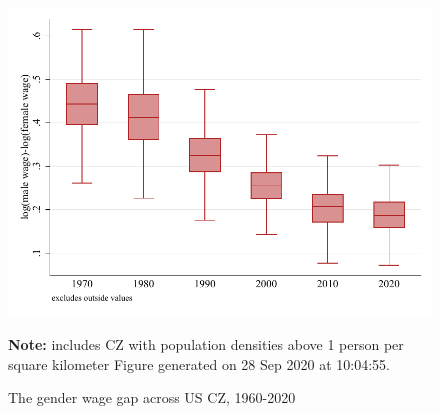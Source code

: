 \begin{figure}[!h]
\centering
\caption{The gender wage gap across US CZ, 1960-2020}
\label{fig:cz_dispersion}
\includegraphics[width=1\textwidth]{../2_analysis/output/figures/cz_variation_gender_gap}
\par \begin{minipage}[h]{\textwidth}{\scriptsize\textbf{Note:} includes CZ with population densities above 1 person per square kilometer Figure generated on 28 Sep 2020 at 10:04:55.}\end{minipage}
\end{figure}
